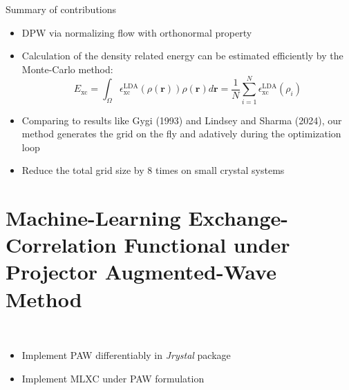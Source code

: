 \documentclass[aspectratio=169]{beamer}
\begin{document}
\begin{frame}{Summary of contributions}
	\begin{itemize}
		\item DPW via normalizing flow with orthonormal property
		\item Calculation of the density related energy can be estimated 
		efficiently by the Monte-Carlo method:
		\begin{equation*}
			E_{\text{xc}} = \int_{\Omega} \epsilon_{\text{xc}}^{\text{LDA}}(\rho(\mathbf{r}))
			\rho(\mathbf{r})d\mathbf{r} = \frac{1}{N} \sum_{i=1}^N \epsilon_{\text{xc}}^{\text{LDA}}(\rho_i)
		\end{equation*}
		\item Comparing to results like Gygi (1993) and Lindsey and Sharma (2024), our method generates the grid on the fly and
		adatively during the optimization loop
		\item Reduce the total grid size by $8$ times on small crystal systems
	\end{itemize}
\end{frame}


\section{Machine-Learning Exchange-Correlation Functional under Projector Augmented-Wave Method}
\begin{frame}
	\centering
	\Large
	\textcolor{blue}{\insertsection}\\
	\vspace{1cm}
	\normalsize
	\begin{itemize}
		\item Implement PAW differentiably in \textit{Jrystal} package
		\item Implement MLXC under PAW formulation
	\end{itemize}
\end{frame}
\end{document}
